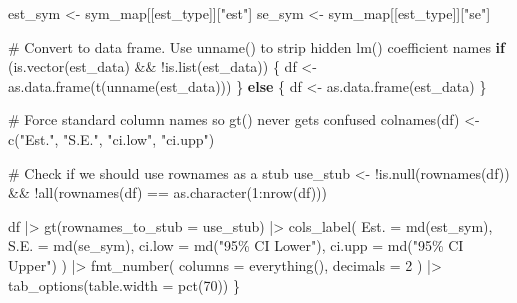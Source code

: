 \documentclass[
  letterpaper,
  DIV=11,
  numbers=noendperiod]{scrreprt}
\newenvironment{Shaded}{\begin{snugshade}}{\end{snugshade}}
\newcommand{\AttributeTok}[1]{\textcolor[rgb]{0.40,0.45,0.13}{#1}}
\newcommand{\CommentTok}[1]{\textcolor[rgb]{0.37,0.37,0.37}{#1}}
\newcommand{\ControlFlowTok}[1]{\textcolor[rgb]{0.00,0.23,0.31}{\textbf{#1}}}
\newcommand{\DecValTok}[1]{\textcolor[rgb]{0.68,0.00,0.00}{#1}}
\newcommand{\FunctionTok}[1]{\textcolor[rgb]{0.28,0.35,0.67}{#1}}
\newcommand{\NormalTok}[1]{\textcolor[rgb]{0.00,0.23,0.31}{#1}}
\newcommand{\OtherTok}[1]{\textcolor[rgb]{0.00,0.23,0.31}{#1}}
\newcommand{\SpecialCharTok}[1]{\textcolor[rgb]{0.37,0.37,0.37}{#1}}
\newcommand{\StringTok}[1]{\textcolor[rgb]{0.13,0.47,0.30}{#1}}
\renewcommand{\[}{\begin{equation}}
\renewcommand{\]}{\end{equation}}
\begin{document}
\begin{Shaded}
\begin{Highlighting}[]
\NormalTok{  est\_sym }\OtherTok{\textless{}{-}}\NormalTok{ sym\_map[[est\_type]][}\StringTok{"est"}\NormalTok{]}
\NormalTok{  se\_sym  }\OtherTok{\textless{}{-}}\NormalTok{ sym\_map[[est\_type]][}\StringTok{"se"}\NormalTok{]}

  \CommentTok{\# Convert to data frame. Use unname() to strip hidden lm() coefficient names}
  \ControlFlowTok{if}\NormalTok{ (}\FunctionTok{is.vector}\NormalTok{(est\_data) }\SpecialCharTok{\&\&} \SpecialCharTok{!}\FunctionTok{is.list}\NormalTok{(est\_data)) \{}
\NormalTok{    df }\OtherTok{\textless{}{-}} \FunctionTok{as.data.frame}\NormalTok{(}\FunctionTok{t}\NormalTok{(}\FunctionTok{unname}\NormalTok{(est\_data)))}
\NormalTok{  \} }\ControlFlowTok{else}\NormalTok{ \{}
\NormalTok{    df }\OtherTok{\textless{}{-}} \FunctionTok{as.data.frame}\NormalTok{(est\_data)}
\NormalTok{  \}}

  \CommentTok{\# Force standard column names so gt() never gets confused}
  \FunctionTok{colnames}\NormalTok{(df) }\OtherTok{\textless{}{-}} \FunctionTok{c}\NormalTok{(}\StringTok{"Est."}\NormalTok{, }\StringTok{"S.E."}\NormalTok{, }\StringTok{"ci.low"}\NormalTok{, }\StringTok{"ci.upp"}\NormalTok{)}

  \CommentTok{\# Check if we should use rownames as a stub}
\NormalTok{  use\_stub }\OtherTok{\textless{}{-}} \SpecialCharTok{!}\FunctionTok{is.null}\NormalTok{(}\FunctionTok{rownames}\NormalTok{(df)) }\SpecialCharTok{\&\&} \SpecialCharTok{!}\FunctionTok{all}\NormalTok{(}\FunctionTok{rownames}\NormalTok{(df) }\SpecialCharTok{==} \FunctionTok{as.character}\NormalTok{(}\DecValTok{1}\SpecialCharTok{:}\FunctionTok{nrow}\NormalTok{(df)))}

\NormalTok{  df }\SpecialCharTok{|\textgreater{}}
    \FunctionTok{gt}\NormalTok{(}\AttributeTok{rownames\_to\_stub =}\NormalTok{ use\_stub) }\SpecialCharTok{|\textgreater{}}
    \FunctionTok{cols\_label}\NormalTok{(}
      \AttributeTok{Est.   =} \FunctionTok{md}\NormalTok{(est\_sym),}
      \AttributeTok{S.E.   =} \FunctionTok{md}\NormalTok{(se\_sym),}
      \AttributeTok{ci.low =} \FunctionTok{md}\NormalTok{(}\StringTok{"95\% CI Lower"}\NormalTok{),}
      \AttributeTok{ci.upp =} \FunctionTok{md}\NormalTok{(}\StringTok{"95\% CI Upper"}\NormalTok{)}
\NormalTok{    ) }\SpecialCharTok{|\textgreater{}}
    \FunctionTok{fmt\_number}\NormalTok{(}
      \AttributeTok{columns =} \FunctionTok{everything}\NormalTok{(),}
      \AttributeTok{decimals =} \DecValTok{2}
\NormalTok{    ) }\SpecialCharTok{|\textgreater{}}
    \FunctionTok{tab\_options}\NormalTok{(}\AttributeTok{table.width =} \FunctionTok{pct}\NormalTok{(}\DecValTok{70}\NormalTok{))}
\NormalTok{\}}


\end{Highlighting}
\end{Shaded}
\end{document}
